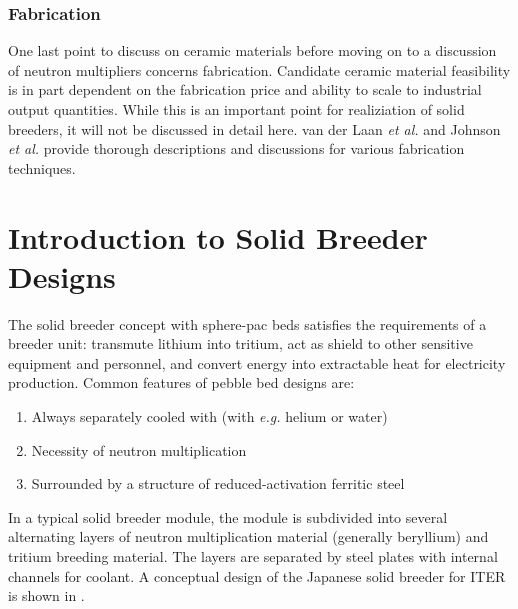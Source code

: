 \documentclass[11pt]{report} %
\begin{document}
\subsection{Fabrication}
One last point to discuss on ceramic materials before moving on to a discussion of neutron multipliers concerns fabrication. Candidate ceramic material feasibility is in part dependent on the fabrication price and ability to scale to industrial output quantities. While this is an important point for realiziation of solid breeders, it will not be discussed in detail here. van der Laan \textit{et al.}\cite{vanderLaan200099} and Johnson \textit{et al.}\cite{Johnson1991} provide thorough descriptions and discussions for various fabrication techniques.



































\chapter{Introduction to Solid Breeder Designs}
The solid breeder concept with sphere-pac beds satisfies the requirements of a breeder unit: transmute lithium into tritium, act as shield to other sensitive equipment and personnel, and convert energy into extractable heat for electricity production. Common features of pebble bed designs are:
\begin{enumerate}
\item{Always separately cooled with (with \textit{e.g.} helium or water)}
\item{Necessity of neutron multiplication}
\item{Surrounded by a structure of reduced-activation ferritic steel}
\end{enumerate}
In a typical solid breeder module, the module is subdivided into several alternating layers of neutron multiplication material (generally beryllium) and tritium breeding material. The layers are separated by steel plates with internal channels for coolant. A conceptual design of the Japanese solid breeder for ITER is shown in .
\end{document}
